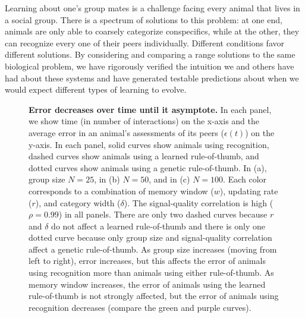 Learning about one's group mates is a challenge facing every animal that lives in a social group. There is a spectrum of solutions to this problem: at one end, animals are only able to coarsely categorize conspecifics, while at the other, they can recognize every one of their peers individually. Different conditions favor different solutions. By considering and comparing a range solutions to the same biological problem, we have rigorously verified the intuition we and others have had about these systems and have generated testable predictions about when we would expect different types of learning to evolve. 
  

\newpage



\newpage
\begin{figure}
\caption{\label{learning_curves} \sffamily\small\textbf{Error decreases over time until it  asymptote.}
In each panel, we show time (in number of interactions) on the x-axis and the average error in an animal's assessments of its peers ($\epsilon(t)$) on the y-axis. In each panel, solid curves show animals using recognition, dashed curves show animals using a learned rule-of-thumb, and dotted curves show animals using a genetic rule-of-thumb. In (a), group size $N=25$, in (b) $N=50$, and in (c) $N=100$. Each color corresponds to a combination of memory window ($w$), updating rate ($r$), and category width ($\delta$). The signal-quality correlation is high ($\rho=0.99$) in all panels. There are only two dashed curves because $r$ and $\delta$ do not affect a learned rule-of-thumb and there is only one dotted curve because only group size and signal-quality correlation affect a genetic rule-of-thumb. As group size increases (moving from left to right), error increases, but this affects the error of animals using recognition more than animals using either rule-of-thumb. As memory window increases, the error of animals using the learned rule-of-thumb is not strongly affected, but the error of animals using recognition decreases (compare the green and purple curves).}
\end{figure}

